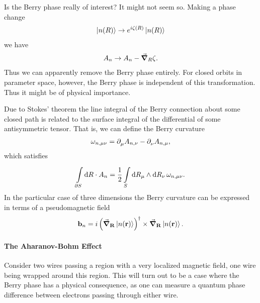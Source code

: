 Is the Berry phase really of interest? It might not seem so. Making a phase change
\begin{align*}
	\ket{n(R)}\to e^{i\zeta(R)}\ket{n(R)}
\end{align*}
we have
\begin{align*}
	A_{n}\to A_{n} - \grad_{R}\zeta.
\end{align*}
Thus we can apparently remove the Berry phase entirely. For closed orbits in parameter space, however, the Berry phase is independent of this transformation. Thus it might be of physical importance.

Due to Stokes' theorem the line integral of the Berry connection about some closed path is related to the surface integral of the differential of some antisymmetric tensor. That is, we can define the Berry curvature
\begin{align*}
\omega_{n, \mu\nu} = \partial^{}_{\mu}A_{n, \nu} - \partial^{}_{\nu}A_{n, \mu},
\end{align*}
which satisfies
\begin{align*}
\int\limits_{\partial S}^{}\dd{R}\cdot A_{n} = \frac{1}{2}\int\limits_{S}^{}\dd{R_{\mu}}\wedge\dd{R_{\nu}}\omega_{n, \mu\nu}.
\end{align*}
In the particular case of three dimensions the Berry curvature can be expressed in terms of a pseudomagnetic field
\begin{align*}
\vb{b}_{n} = i\left(\grad_{\vb{R}}\ket{n(\vb{r})}\right)^{\dagger}\times\grad_{\vb{R}}\ket{n(\vb{r})}.
\end{align*}

\paragraph{The Aharanov-Bohm Effect}
Consider two wires passing a region with a very localized magnetic field, one wire being wrapped around this region. This will turn out to be a case where the Berry phase has a physical consequence, as one can measure a quantum phase difference between electrons passing through either wire.


